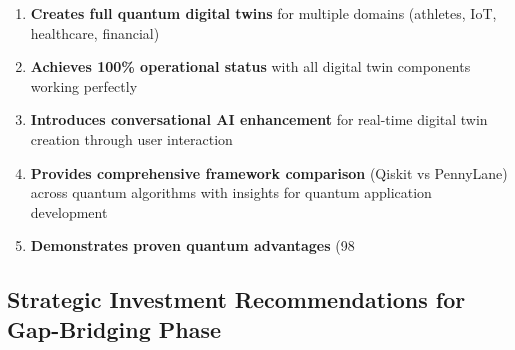 \documentclass[12pt,a4paper]{article}
\begin{document}
\begin{enumerate}
    \item \textbf{Creates full quantum digital twins} for multiple domains (athletes, IoT, healthcare, financial)
    \item \textbf{Achieves 100\% operational status} with all digital twin components working perfectly
    \item \textbf{Introduces conversational AI enhancement} for real-time digital twin creation through user interaction
    \item \textbf{Provides comprehensive framework comparison} (Qiskit vs PennyLane) across quantum algorithms with insights for quantum application development
    \item \textbf{Demonstrates proven quantum advantages} (98%
\end{enumerate}

\subsection{Strategic Investment Recommendations for Gap-Bridging Phase}
\end{document}
